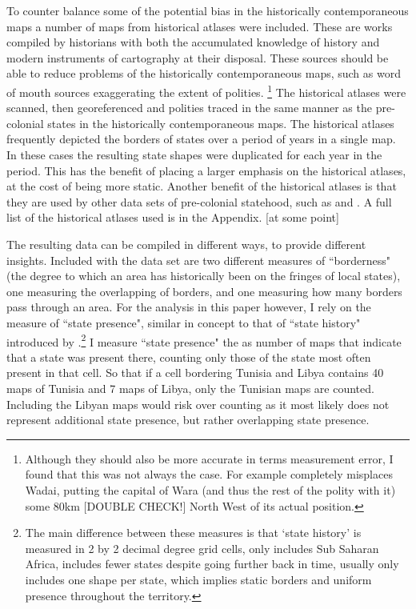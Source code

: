 \documentclass[12pt]{article}
\begin{document}

To counter balance some of the potential bias in the historically
contemporaneous maps a number of maps from historical atlases were included. These
are works compiled by historians with both the accumulated knowledge of history
and modern instruments of cartography at their disposal. These sources should be
able to reduce problems of the historically contemporaneous maps, such as word
of mouth sources exaggerating the extent of polities. \footnote{Although they should also
be more accurate in terms measurement error, I found that this was not always
the case. For example \citep{Kasule1998} completely misplaces Wadai, putting the
capital of Wara (and thus the rest of the polity with it) some 80km [DOUBLE
CHECK!] North West of its actual position.} The historical atlases were scanned,
then georeferenced and polities traced in the same manner as the pre-colonial
states in the historically contemporaneous maps. The historical atlases
frequently depicted the borders of states over a period of years in a single
map. In these cases the resulting state shapes were duplicated for each year in
the period. This has the benefit of placing a larger emphasis on the historical
atlases, at the cost of being more static. Another benefit of the historical
atlases is that they are used by other data sets of pre-colonial statehood, such
as \citet{Paine2019} and \citet{Depetris-Chauvin2016}. A full list of the
historical atlases used is in the Appendix. [at some point]

The resulting data can be compiled in different ways, to provide different
insights. Included with the data set are two different measures of ``borderness"
(the degree to which an area has historically been on the fringes of local
states), one measuring the overlapping of borders, and one measuring how many
borders pass through an area. For the analysis in this paper however, I rely on
the measure of ``state presence", similar in concept to that of ``state history"
introduced by \citet{Depetris-Chauvin2016}.\footnote{The main difference between
	these measures is that `state history' is measured in 2 by 2 decimal
	degree grid cells, only includes Sub Saharan Africa, includes fewer
	states despite going further back in time, usually only includes one
	shape per state, which implies static borders and uniform presence
throughout the territory.} I measure ``state presence" the as number of maps
that indicate that a state was present there, counting only those of the state
most often present in that cell. So that if a cell bordering Tunisia and Libya
contains 40 maps of Tunisia and 7 maps of Libya, only the Tunisian maps are
counted. Including the Libyan maps would risk over counting as it most likely
does not represent additional state presence, but rather overlapping state
presence. 
\end{document}
